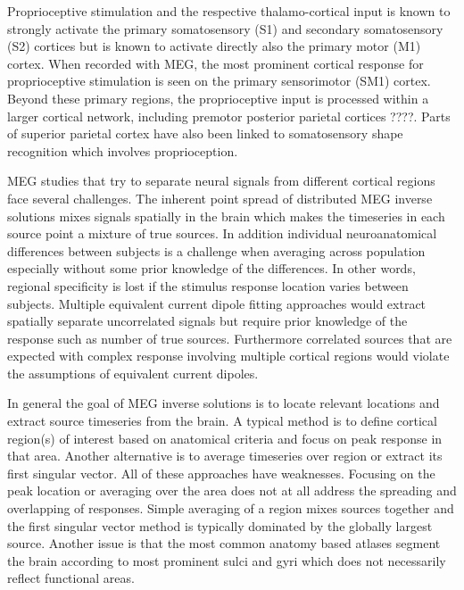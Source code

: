 \documentclass[]{article}
\begin{document}


Proprioceptive stimulation and the respective thalamo-cortical input is known to strongly activate the primary somatosensory (S1) and secondary somatosensory (S2) cortices but is known to activate directly also the primary motor (M1) cortex. When recorded with MEG, the most prominent cortical response for proprioceptive stimulation is seen on the primary sensorimotor (SM1) cortex. Beyond these primary regions, the proprioceptive input is processed within a larger cortical network, including premotor posterior parietal cortices ????. Parts of superior parietal cortex have also been linked to somatosensory shape recognition which involves proprioception. 


MEG studies that try to separate neural signals from different cortical regions face several challenges. The inherent point spread of distributed MEG inverse solutions mixes signals spatially in the brain which makes the timeseries in each source point a mixture of true sources. In addition individual neuroanatomical differences between subjects is a challenge when averaging across population especially without some prior knowledge of the differences. In other words, regional specificity is lost if the stimulus response location varies between subjects. Multiple equivalent current dipole fitting approaches would extract spatially separate uncorrelated signals but require prior knowledge of the response such as number of true sources. Furthermore correlated sources that are expected with complex response involving multiple cortical regions would violate the assumptions of equivalent current dipoles. 

In general the goal of MEG inverse solutions is to locate relevant locations and extract source timeseries from the brain. A typical method is to define cortical region(s) of interest based on anatomical criteria and focus on peak response in that area.  Another alternative is to average timeseries over region or extract its first singular vector. All of these approaches have weaknesses. Focusing on the peak location or averaging over the area does not at all address the spreading and overlapping of responses. Simple averaging of a region mixes sources together and the first singular vector method is typically dominated by the globally largest source. Another issue is that the most common anatomy based atlases segment the brain according to most prominent sulci and gyri which does not necessarily reflect functional areas. 
\end{document}
